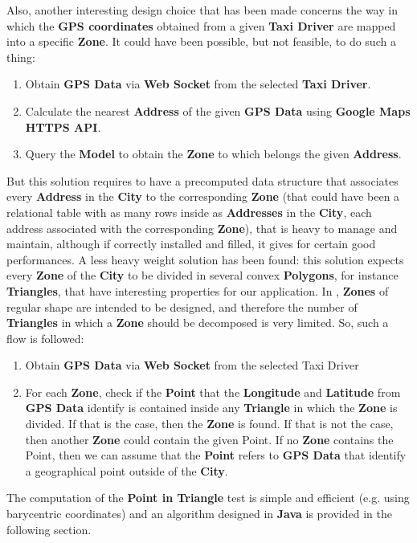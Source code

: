 Also, another interesting design choice that has been made concerns the way in which the \textbf{GPS coordinates} obtained from a given \textbf{Taxi Driver} are mapped into a specific \textbf{Zone}.
It could have been possible, but not feasible, to do such a thing:
\begin{enumerate}
	\item Obtain \textbf{GPS Data} via \textbf{Web Socket} from the selected \textbf{Taxi Driver}.
	\item Calculate the nearest \textbf{Address} of the given \textbf{GPS Data} using \textbf{Google Maps HTTPS API}.
	\item Query the \textbf{Model} to obtain the \textbf{Zone} to which belongs the given \textbf{Address}.
\end{enumerate}
But this solution requires to have a precomputed data structure that associates every \textbf{Address} in the \textbf{City} to the corresponding \textbf{Zone} (that could have been a relational table with as many rows inside as \textbf{Addresses} in the \textbf{City}, each address associated with the corresponding \textbf{Zone}), that is heavy to manage and maintain, although if correctly installed and filled, it gives for certain good performances.
A less heavy weight solution has been found: this solution expects every \textbf{Zone} of the \textbf{City} to be divided in several convex \textbf{Polygons}, for instance \textbf{Triangles}, that have interesting properties for our application.
In \myTaxiService{}, \textbf{Zones} of regular shape are intended to be designed, and therefore the number of \textbf{Triangles} in which a \textbf{Zone} should be decomposed is very limited.
So, such a flow is followed:
\begin{enumerate}
	\item Obtain \textbf{GPS Data} via \textbf{Web Socket} from the selected Taxi Driver
	\item For each \textbf{Zone}, check if the \textbf{Point} that the \textbf{Longitude} and \textbf{Latitude} from \textbf{GPS Data} identify is contained inside any \textbf{Triangle} in which the \textbf{Zone} is divided. If that is the case, then the \textbf{Zone} is found. If that is not the case, then another \textbf{Zone} could contain the given Point. If no \textbf{Zone} contains the Point, then we can assume that the \textbf{Point} refers to \textbf{GPS Data} that identify a geographical point outside of the \textbf{City}.
\end{enumerate}
The computation of the \textbf{Point in Triangle} test is simple and efficient (e.g. using barycentric coordinates) and an algorithm designed in \textbf{Java} is provided in the following section.
